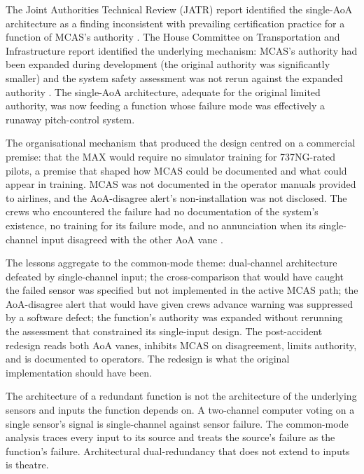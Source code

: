 The Joint Authorities Technical Review (JATR) report identified the single-AoA architecture as a finding inconsistent with prevailing certification practice for a function of MCAS's authority \cite{acc:jatr-737max-2019}. The House Committee on Transportation and Infrastructure report identified the underlying mechanism: MCAS's authority had been expanded during development (the original authority was significantly smaller) and the system safety assessment was not rerun against the expanded authority \cite{acc:house-737max-2020}. The single-AoA architecture, adequate for the original limited authority, was now feeding a function whose failure mode was effectively a runaway pitch-control system.

The organisational mechanism that produced the design centred on a commercial premise: that the MAX would require no simulator training for 737NG-rated pilots, a premise that shaped how MCAS could be documented and what could appear in training. MCAS was not documented in the operator manuals provided to airlines, and the AoA-disagree alert's non-installation was not disclosed. The crews who encountered the failure had no documentation of the system's existence, no training for its failure mode, and no annunciation when its single-channel input disagreed with the other AoA vane \cite{acc:house-737max-2020}.

The lessons aggregate to the common-mode theme: dual-channel architecture defeated by single-channel input; the cross-comparison that would have caught the failed sensor was specified but not implemented in the active MCAS path; the AoA-disagree alert that would have given crews advance warning was suppressed by a software defect; the function's authority was expanded without rerunning the assessment that constrained its single-input design. The post-accident redesign reads both AoA vanes, inhibits MCAS on disagreement, limits authority, and is documented to operators. The redesign is what the original implementation should have been.

\begin{principle}
The architecture of a redundant function is not the architecture of the underlying sensors and inputs the function depends on. A two-channel computer voting on a single sensor's signal is single-channel against sensor failure. The common-mode analysis traces every input to its source and treats the source's failure as the function's failure. Architectural dual-redundancy that does not extend to inputs is theatre.
\end{principle}

